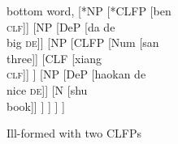 \documentclass[output=paper,colorlinks,citecolor=brown]{langscibook}
\begin{document}
\begin{figure}
  \centering
		\begin{forest}
			bottom word,
			[*NP
			[*CLFP [ben \\ \textsc{clf}]]
			[NP
			[DeP [da de\\ big \textsc{de}]]
			[NP
			[CLFP
				[Num [san \\ three]]
				[CLF [xiang \\ \textsc{clf}]]
			]
				[NP
					[DeP [haokan de\\ nice \textsc{de}]]
					[N [shu\\book]]
				]
			]
			]
			]
		\end{forest}
  \caption{Ill-formed  with two CLFPs}
  \label{fig:npw2cl:deng}
\end{figure}
\end{document}

